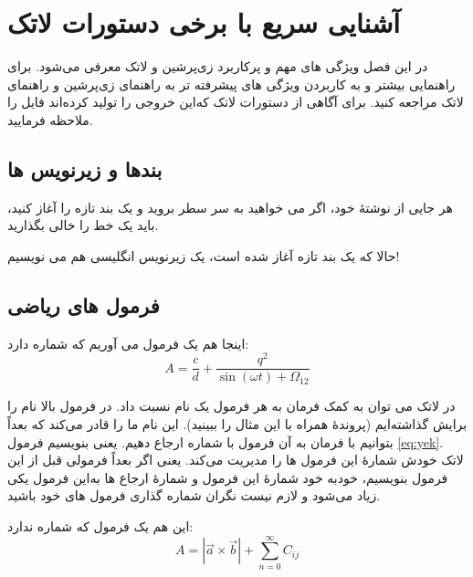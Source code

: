 
\chapter{آشنایی سریع با برخی دستورات لاتک}\label{Chap:chapter2}

در این فصل ویژگی های مهم و پرکاربرد زی‌پرشین و لاتک معرفی می‌شود. برای راهنمایی بیشتر و به کاربردن ویژگی های پیشرفته تر به راهنمای زی‌پرشین و راهنمای لاتک مراجعه کنید. برای آگاهی از دستورات لاتک که‌این خروجی را تولید کرده‌اند فایل  را ملاحظه فرمایید.

\section{بندها و زیرنویس ها}
هر جایی از نوشتهٔ خود، اگر می خواهید به سر سطر بروید و یک بند تازه را آغاز کنید، باید یک خط را خالی بگذارید.

حالا که یک بند تازه آغاز شده است، یک زیرنویس انگلیسی
 هم می نویسیم!
\section{فرمول های ریاضی}\label{formula}

اینجا هم یک فرمول می آوریم که شماره دارد:
\begin{equation}\label{eq:yek}
A=\frac{c}{d}+\frac{q^2}{\sin(\omega t)+\Omega_{12}}
\end{equation}


در لاتک می توان به کمک فرمان 
به هر فرمول یک نام نسبت داد. در فرمول بالا نام  را برایش گذاشته‌ایم (پروندهٔ  همراه با این مثال را ببینید). این نام ما را قادر می‌کند که بعداً بتوانیم با فرمان
به آن فرمول با شماره ارجاع دهیم. یعنی بنویسیم فرمول \ref{eq:yek}. 
لاتک خودش شمارهٔ این فرمول ها را مدیریت می‌کند. یعنی اگر بعداً فرمولی قبل از این فرمول بنویسیم، خودبه خود شمارهٔ این فرمول و شمارهٔ ارجاع ها به‌این فرمول یکی زیاد می‌شود و لازم نیست نگران شماره گذاری فرمول های خود باشید.

این هم یک فرمول که شماره ندارد:
$$A=|\vec{a}\times \vec{b}| + \sum_{n=0}^\infty C_{ij}$$


